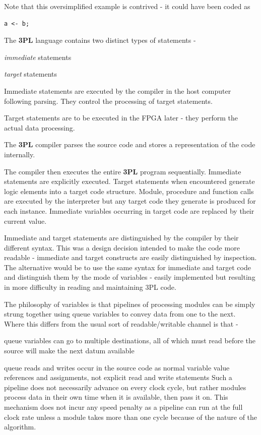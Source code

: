     Note that this oversimplified example is contrived - it could have
    been coded as
    
    \begin{lstlisting}[gobble=4, language=threepl]
        a <- b;
    \end{lstlisting}

    The {\bf 3PL} language contains two distinct types of statements -
    \blist
    \item    {\em immediate} statements
    \item    {\em target} statements
    \blend

    Immediate statements  are executed by the
    compiler in the host computer following parsing. They control the processing
    of target statements.

    Target statements  are to be executed in the FPGA
    later - they perform the actual data processing.

    The {\bf 3PL} compiler parses the source code and stores a
    representation of the code internally.

    The compiler then executes the entire {\bf 3PL} program sequentially.
    Immediate statements are explicitly executed. Target statements when
    encountered generate logic elements into a target code structure.
    Module, procedure and function calls are executed by the interpreter but
    any target code they generate is produced for each instance.
    Immediate variables occurring in target code are replaced by their
    current value.

    Immediate and target statements are distinguished by the compiler by
    their different syntax. This was a design decision intended to make
    the code more readable - immediate and target constructs are easily
    distinguished by inspection. The alternative would be to use the same
    syntax for immediate and target code and distinguish them by the mode
    of variables - easily implemented but resulting in more difficulty in
    reading and maintaining 3PL code.

    The philosophy of  variables is that pipelines
     of processing modules can be simply strung together
    using queue variables to convey data from one to the next. Where this
    differs from the usual sort of readable/writable channel is that -
    \blist
    \item   queue variables can go to multiple destinations, all of which
            must read before the source will make the next datum available
    \item   queue reads and writes occur in the source code as normal
            variable value references and assignments, not explicit read
            and write statements
    \blend
    Such a pipeline does not necessarily advance on every clock cycle,
    but rather modules process data in their own time when it is
    available, then pass it on. This mechanism does not incur any speed
    penalty as a pipeline can run at the full clock rate unless a module
    takes more than one cycle because of the nature of the algorithm.

